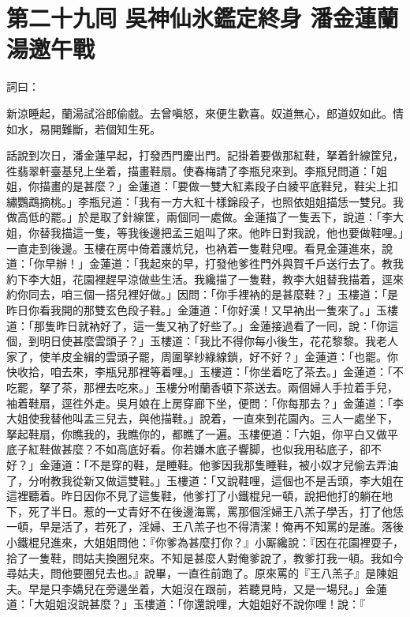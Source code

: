 
\chapter*{第二十九囘 吳神仙氷鑑定終身 潘金蓮蘭湯邀午戰}


詞曰：

\begin{myquote}
新涼睡起，蘭湯試浴郎偷戲。去曾嗔怒，來便生歡喜。奴道無心，郎道奴如此。情如水，易開難斷，若個知生死。

\end{myquote}

話說到次日，潘金蓮早起，打發西門慶出門。記掛着要做那紅鞋，{}拏着針線筐兒，徃翡翠軒臺基兒上坐着，描畫鞋扇。使春梅請了李瓶兒來到。李瓶兒問道：「姐姐，你描畫的是甚麼？」金蓮道：「要做一雙大紅素段子白綾平底鞋兒，鞋尖上扣繡鸚鵡摘桃。」李瓶兒道：「我有一方大紅十樣錦段子，也照依姐姐描恁一雙兒。我做高低的罷。」於是取了針線筐，兩個同一處做。金蓮描了一隻丟下，說道：「李大姐，你替我描這一隻，等我後邊把孟三姐叫了來。他昨日對我說，他也要做鞋哩。」一直走到後邊。玉樓在房中倚着護炕兒，也衲着一隻鞋兒哩。看見金蓮進來，說道：「你早辦！」金蓮道：「我起來的早，打發他爹徃門外與賀千戶送行去了。教我約下李大姐，花園裡趕早涼做些生活。我纔描了一隻鞋，教李大姐替我描着，逕來約你同去，咱三個一搭兒裡好做。」因問：「你手裡衲的是甚麼鞋？」玉樓道：「是昨日你看我開的那雙玄色段子鞋。」金蓮道：「你好漢！又早衲出一隻來了。」玉樓道：「那隻昨日就衲好了，這一隻又衲了好些了。」金蓮接過看了一囘，說：「你這個，到明日使甚麼雲頭子？」玉樓道：「我比不得你每小後生，花花黎黎。{}我老人家了，使羊皮金緝的雲頭子罷，周圍拏紗綠線鎖，好不好？」金蓮道：「也罷。你快收拾，咱去來，李瓶兒那裡等着哩。」玉樓道：「你坐着吃了茶去。」金蓮道：「不吃罷，拏了茶，那裡去吃來。」玉樓分咐蘭香頓下茶送去。兩個婦人手拉着手兒，袖着鞋扇，逕徃外走。吳月娘在上房穿廊下坐，便問：「你每那去？」金蓮道：「李大姐使我替他叫孟三兒去，與他描鞋。」{}說着，一直來到花園內。三人一處坐下，拏起鞋扇，你瞧我的，我瞧你的，{}都瞧了一遍。玉樓便道：「六姐，你平白又做平底子紅鞋做甚麼？不如高底好看。你若嫌木底子響脚，也似我用毡底子，卻不好？」{}金蓮道：「不是穿的鞋，是睡鞋。他爹因我那隻睡鞋，被小奴才兒偷去弄油了，分咐教我從新又做這雙鞋。」玉樓道：「又說鞋哩，這個也不是舌頭，李大姐在這裡聽着。昨日因你不見了這隻鞋，他爹打了小鐵棍兒一頓，說把他打的躺在地下，死了半日。惹的一丈青好不在後邊海罵，罵那個淫婦王八羔子學舌，打了他恁一頓，早是活了，若死了，淫婦、王八羔子也不得清潔！俺再不知罵的是誰。落後小鐵棍兒進來，大姐姐問他：『你爹為甚麼打你？』小厮纔說：『因在花園裡耍子，拾了一隻鞋，問姑夫換圈兒來。不知是甚麼人對俺爹說了，教爹打我一頓。我如今尋姑夫，問他要圈兒去也。』說畢，一直徃前跑了。原來罵的『王八羔子』是陳姐夫。{}早是只李嬌兒在旁邊坐着，大姐沒在跟前，若聽見時，又是一場兒。」金蓮道：「大姐姐沒說甚麼？」玉樓道：「你還說哩，大姐姐好不說你哩！說：『